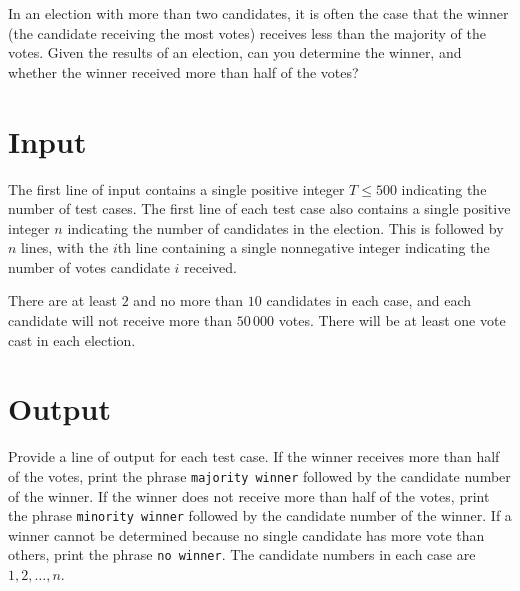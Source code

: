 
\setlength{\columnsep}{15pt}




In an election with more than two candidates, it is often the case that
the winner (the candidate receiving the most votes) receives less than
the majority of the votes.  Given the results of an election, can you
determine the winner, and whether the winner received more than half
of the votes?

\section*{Input}
The first line of input contains a single positive integer $T \leq
500$ indicating the number of test cases. The first line of each test
case also contains a single positive integer $n$ indicating the number
of candidates in the election.  This is followed by $n$ lines, with
the $i$th line containing a single nonnegative integer indicating the
number of votes candidate $i$ received.

There are at least $2$ and no more than $10$ candidates in each case, and
each candidate will not receive more than $50\,000$ votes.  There will be
at least one vote cast in each election.

\section*{Output}

Provide a line of output for each test case.  If the winner receives
more than half of the votes, print the phrase \verb|majority winner|
followed by the candidate number of the winner.  If the winner does
not receive more than half of the votes, print the phrase
\verb|minority winner| followed by the candidate number of the winner.
If a winner cannot be determined because no single candidate has more
vote than others, print the phrase \verb|no winner|.  The candidate 
numbers in each case are $1, 2, \ldots, n$.

